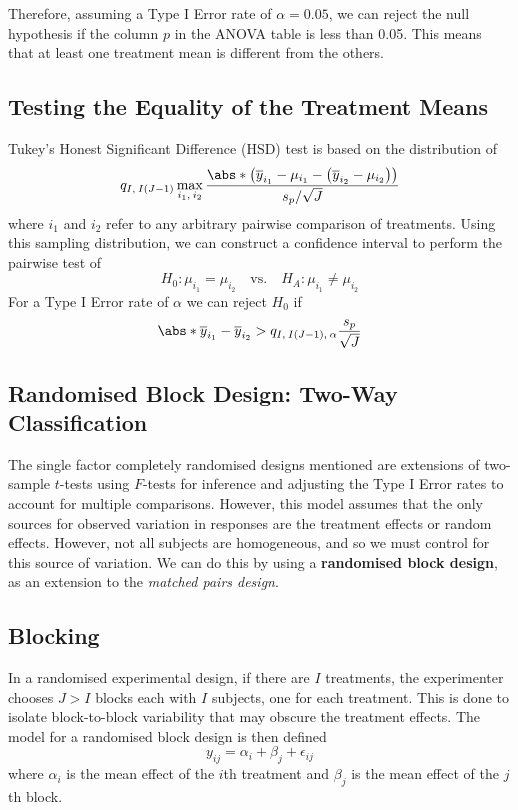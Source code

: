 \documentclass{article}
\begin{document}
Therefore, assuming a Type I Error rate of \(\alpha = 0.05\), we can reject the null hypothesis if
the column \(p\) in the ANOVA table is less than 0.05. This means that at least one treatment mean is different from the others.
\subsection{Testing the Equality of the Treatment Means}
Tukey's Honest Significant Difference (HSD) test is based on the distribution of
\begin{equation*}
    q_{I,\: I\left( J - 1 \right)} \max_{i_1,\: i_2} \frac{\abs*{\left( \overline{y}_{i_1} - \mu_{i_1} - \left( \overline{y}_{i_2} - \mu_{i_2} \right) \right)}}{s_p / \sqrt{J}}
\end{equation*}
where \(i_1\) and \(i_2\) refer to any arbitrary pairwise comparison of treatments. Using this sampling distribution, we can construct a confidence interval to perform the
pairwise test of
\begin{equation*}
    H_0 : \mu_{i_1} = \mu_{i_2} \quad \text{vs.} \quad H_A : \mu_{i_1} \neq \mu_{i_2}
\end{equation*}
For a Type I Error rate of \(\alpha\) we can reject \(H_0\) if
\begin{equation*}
    \abs*{\overline{y}_{i_1} - \overline{y}_{i_2}} > q_{I,\: I\left( J - 1 \right),\: \alpha} \frac{s_p}{\sqrt{J}}
\end{equation*}
\subsection{Randomised Block Design: Two-Way Classification}
The single factor completely randomised designs mentioned are extensions of
two-sample \(t\)-tests using \(F\)-tests for inference and adjusting the Type I Error rates to
account for multiple comparisons. However, this model assumes that the only sources for observed variation
in responses are the treatment effects or random effects. However, not all subjects are homogeneous, and
so we must control for this source of variation. We can do this by using a \textbf{randomised block design},
as an extension to the \textit{matched pairs design}.
\subsection{Blocking}
In a randomised experimental design, if there are \(I\) treatments, the experimenter chooses \(J > I\) blocks
each with \(I\) subjects, one for each treatment. This is done to isolate block-to-block variability that may
obscure the treatment effects. The model for a randomised block design is then defined
\begin{equation*}
    y_{ij} = \alpha_i + \beta_j + \epsilon_{ij}
\end{equation*}
where \(\alpha_i\) is the mean effect of the \(i\)th treatment and
\(\beta_j\) is the mean effect of the \(j\)th block.
\end{document}
